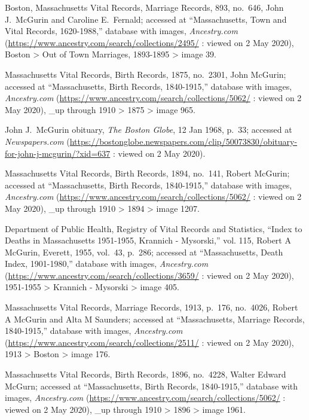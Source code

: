 \begin{thebibliography}{999}
	Boston, Massachusetts Vital Records, Marriage Records, 893, no.\ 646, John J.\ McGurin and Caroline E.\ Fernald; accessed at ``Massachusetts, Town and Vital Records, 1620-1988,'' database with images, \textit{Ancestry.com} (\url{https://www.ancestry.com/search/collections/2495/} : viewed on 2 May 2020), Boston > Out of Town Marriages, 1893-1895 > image 39.
	
	Massachusetts Vital Records, Birth Records, 1875, no.\ 2301, John McGurin; accessed at ``Massachusetts, Birth Records, 1840-1915,'' database with images, \textit{Ancestry.com} (\url{https://www.ancestry.com/search/collections/5062/} : viewed on 2 May 2020), \_up through 1910 > 1875 > image 965.
	
	John J.\ McGurin obituary, \textit{The Boston Globe}, 12 Jan 1968, p.\ 33; accessed at \textit{Newspapers.com} (\url{https://bostonglobe.newspapers.com/clip/50073830/obituary-for-john-j-mcgurin/?xid=637} : viewed on 2 May 2020).
	
	Massachusetts Vital Records, Birth Records, 1894, no.\ 141, Robert McGurin; accessed at ``Massachusetts, Birth Records, 1840-1915,'' database with images, \textit{Ancestry.com} (\url{https://www.ancestry.com/search/collections/5062/} : viewed on 2 May 2020), \_up through 1910 > 1894 > image 1207.	
	
	Department of Public Health, Registry of Vital Records and Statistics, ``Index to Deaths in Massachusetts 1951-1955, Krannich - Mysorski,'' vol. 115, Robert A McGurin, Everett, 1955, vol.\ 43, p.\ 286; accessed at ``Massachusetts, Death Index, 1901-1980,'' database with images, \textit{Ancestry.com} (\url{https://www.ancestry.com/search/collections/3659/} : viewed on 2 May 2020), 1951-1955 > Krannich - Mysorski > image 405.
	
	Massachusetts Vital Records, Marriage Records, 1913, p.\ 176, no.\ 4026, Robert A McGurin and Alta M Saunders; accessed at ``Massachusetts, Marriage Records, 1840-1915,'' database with images, \textit{Ancestry.com} (\url{https://www.ancestry.com/search/collections/2511/} : viewed on 2 May 2020), 1913 > Boston > image 176.
	
	Massachusetts Vital Records, Birth Records, 1896, no.\ 4228, Walter Edward McGurn; accessed at ``Massachusetts, Birth Records, 1840-1915,'' database with images, \textit{Ancestry.com} (\url{https://www.ancestry.com/search/collections/5062/} : viewed on 2 May 2020), \_up through 1910 > 1896 > image 1961.
	

\end{thebibliography}
